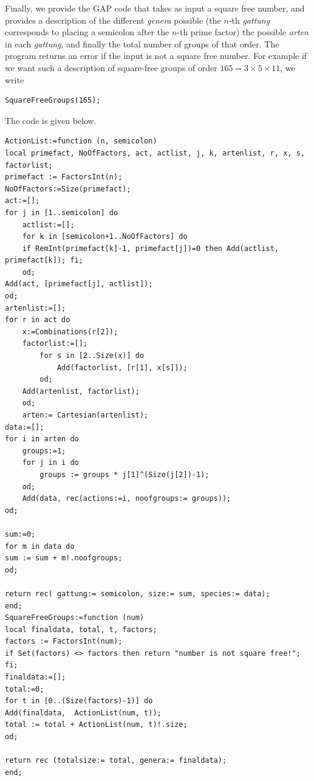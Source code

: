 \documentclass[a4paper, 10pt]{book}
\theoremstyle{definition}
\numberwithin{equation}{chapter}
\begin{document}
Finally, we provide the GAP code that takes as input a square free number, and provides a description of the different \textit{genera} possible (the $n$-th \textit{gattung} corresponds to placing a semicolon after the $n$-th prime factor) the possible \textit{arten} in each \textit{gattung}, and finally the total number of groups of that order. The program returns an error if the input is not a square free number.
For example if we want such a description of square-free groups of order $165 = 3\times 5 \times 11$, we write
\begin{lstlisting}
SquareFreeGroups(165);
\end{lstlisting}
The code is given below. 
\begin{lstlisting}
ActionList:=function (n, semicolon)
local primefact, NoOfFactors, act, actlist, j, k, artenlist, r, x, s, factorlist;
primefact := FactorsInt(n);
NoOfFactors:=Size(primefact);
act:=[];
for j in [1..semicolon] do
	actlist:=[];
	for k in [semicolon+1..NoOfFactors] do
	if RemInt(primefact[k]-1, primefact[j])=0 then Add(actlist, primefact[k]); fi;
	od;
Add(act, [primefact[j], actlist]);
od;
artenlist:=[];
for r in act do
	x:=Combinations(r[2]);
	factorlist:=[];
		for s in [2..Size(x)] do
			Add(factorlist, [r[1], x[s]]);
		od;
	Add(artenlist, factorlist);
	od; 
	arten:= Cartesian(artenlist);
data:=[];
for i in arten do
	groups:=1;
	for j in i do
		groups := groups * j[1]^(Size(j[2])-1);
	od;
	Add(data, rec(actions:=i, noofgroups:= groups));
od;

sum:=0;
for m in data do
sum := sum + m!.noofgroups;
od;

return rec( gattung:= semicolon, size:= sum, species:= data);	 
end;
SquareFreeGroups:=function (num)
local finaldata, total, t, factors;
factors := FactorsInt(num);
if Set(factors) <> factors then return "number is not square free!"; fi;
finaldata:=[];
total:=0;
for t in [0..(Size(factors)-1)] do
Add(finaldata,  ActionList(num, t));
total := total + ActionList(num, t)!.size;
od;

return rec (totalsize:= total, genera:= finaldata);
end;
\end{lstlisting}
\end{document}
